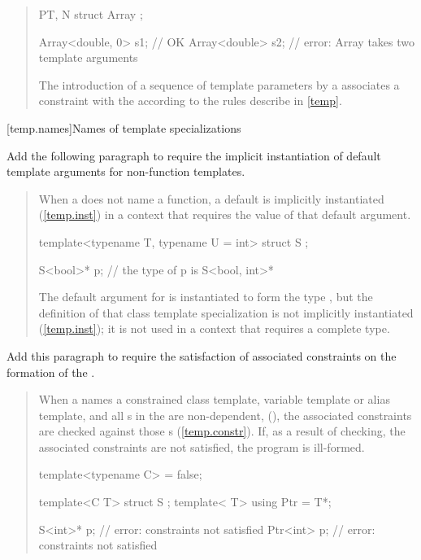 \begin{quote}
\begin{codeblock}
P{T, N} struct Array { };

Array<double, 0> s1; // OK
Array<double> s2;    // error: Array takes two template arguments
\end{codeblock}
\exitexample

\pnum
\enternote
The introduction of a sequence of template parameters by a
 associates a constraint 
with the 
according to the rules describe in \ref{temp}.
\exitnote
    
\end{quote}

[temp.names]{Names of template specializations}


Add the following paragraph to require the implicit instantiation
of default template arguments for non-function templates.

\begin{quote}
\setcounter{Paras}{7}
\pnum
When a  does 
not name a function, a default 
 is implicitly
instantiated (\ref{temp.inst}) in a context that 
requires the value of that default argument.

\enterexample
\begin{codeblock}
template<typename T, typename U = int> struct S { };

S<bool>* p; // the type of p is S<bool, int>*
\end{codeblock}
The default argument for  is instantiated to form
the type , but the definition of that
class template specialization is not implicitly instantiated
(\ref{temp.inst}); it is not used in a 
context that requires a complete type.
\exitexample
\end{quote}

Add this paragraph to require the satisfaction of associated constraints
on the formation of the .

\begin{quote}
\pnum
When a  names
a constrained class template, variable template or alias template,
and all s in the
 are non-dependent,
(), the associated constraints
are checked against those
s
(\ref{temp.constr}). If, as a result of checking,
the associated constraints are not satisfied, the program is ill-formed.

\enterexample
\begin{codeblock}
template<typename C> = false;

template<C T> struct S { };
template< T> using Ptr = T*;

S<int>* p;  // error: constraints not satisfied
Ptr<int> p; // error: constraints not satisfied
\end{codeblock}
\exitexample
\end{quote}


